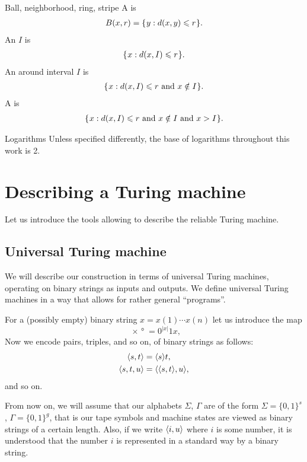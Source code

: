 \documentclass[12pt]{memoir}
\begin{document}
\begin{flushdescription}
\item [Ball, neighborhood, ring, stripe]
A  is
\begin{align*}
    B(x,r)= \mathopen\{\mskip 1mu y : d(x,y)\leqslant r\mskip 1mu\mathclose\}.
\end{align*}
An  \( I \) is
\begin{align*}
    \mathopen\{\mskip 1mu x : d(x,I)\leqslant r\mskip 1mu\mathclose\}.
\end{align*}
An  around interval \( I \) is
\begin{align*}
    \mathopen\{\mskip 1mu x : d(x,I)\leqslant r \text{\rmfamily\mdseries\upshape{ and }} x \notin I\mskip 1mu\mathclose\}.
\end{align*}
A  is
\begin{align*}
    \mathopen\{\mskip 1mu x : d(x,I)\leqslant r \text{\rmfamily\mdseries\upshape{ and }} x \notin I \text{\rmfamily\mdseries\upshape{ and }} x>I\mskip 1mu\mathclose\}.
\end{align*}

\item[Logarithms] Unless specified differently,
the base of logarithms throughout this work is 2.

\end{flushdescription}


\section{Describing a Turing machine}\label{sec:describing}

Let us introduce the tools allowing to describe the reliable Turing machine.

\subsection{Universal Turing machine}\label{sec:UTM}

We will describe our construction in terms of
universal Turing machines,
operating on binary strings as inputs and outputs.
We define universal Turing machines in a way that allows
for rather general ``programs''.

 \begin{definition}
For a (possibly empty) binary string \( x=x(1)\dotsm x(n) \) let us introduce the map
 \[
   \ang{x} = 0^{|x|}1 x,
 \]
Now we encode pairs, triples, and so on, of binary strings as follows:
 \begin{align*}
        {\mathopen\langle s,t\mathclose\rangle} &={\mathopen\langle s\mathclose\rangle}t,
\\ {\mathopen\langle s,t,u\mathclose\rangle} &= {\mathopen\langle {\mathopen\langle s,t\mathclose\rangle},u\mathclose\rangle},
 \end{align*}
and so on.

From now on, we will assume that our alphabets \( \Sigma \), \( \Gamma \)
are of the form \( \Sigma=\{0,1\}^{s} \), \( \Gamma=\{0,1\}^{g} \), that is 
our tape symbols and machine states are viewed as binary strings of a certain length.
Also, if we write \( {\mathopen\langle i,u\mathclose\rangle} \) where \( i \) is some number, it is understood
that the number \( i \) is represented in a standard way by a binary string.
\end{definition}
\end{document}

